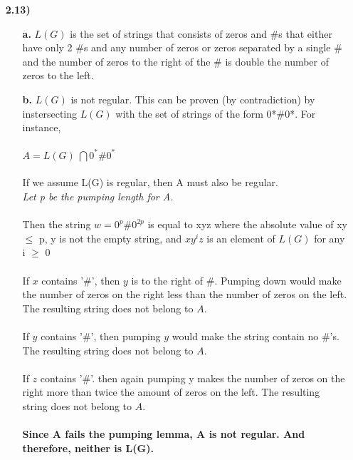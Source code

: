 \documentclass[12pt]{letter}
\newcommand\tab[1][2cm]{\hspace*{#1}}
\begin{document}
\begin{enumerate}
\newpage
\item[\textbf{2.13)}]
\begin{enumerate}
	\begin{enumerate}
	\item[\textbf{a.}]
	$L(G)$ is the set of strings that consists of zeros and \#s that either have only 2 \#s and any number of zeros or zeros separated by a single \# and the number of zeros to the right of the \# is double the number of zeros to the left. \\

	\item[\textbf{b.}] $L(G)$ is not regular. This can be proven (by contradiction) by instersecting $L(G)$ with the set of strings of the form 0*\#0*. For instance, \\
	\leavevmode \\
	\tab $A= L(G)\ \bigcap 0^*\#0^*$\\
	\leavevmode \\
	If we assume L(G) is regular, then A must also be regular. \\

	\tab \textit{Let p be the pumping length for A.} \\ 
	\leavevmode \\
	Then the string $w=0^p\#0^{2p}$ is equal to xyz where the absolute value of xy $\leq $ p, y is not the empty string, and $ xy^{i}z $ is an element of $L(G)$ for any i $ \geq $ 0  \\
	\leavevmode \\
	If $x$ contains '\#', then $y$ is to the right of \#. Pumping down would make the number of zeros on the right less than the number of zeros on the left. The resulting string does not belong to $A$. \\
	\leavevmode \\
	If $y$ contains '\#', then pumping $y$ would make the string contain no \#'s. The resulting string does not belong to $A$. \\
	\leavevmode \\
	If $z$ contains '\#'. then again pumping y makes the number of zeros on the right more than twice the amount of zeros on the left. The resulting string does not belong to $A$. \\
	\leavevmode \\
	\textbf{Since A fails the pumping lemma, A is not regular. And therefore, neither is L(G).} \\
	\end{enumerate}
\end{enumerate}



\end{enumerate}
\end{document}
